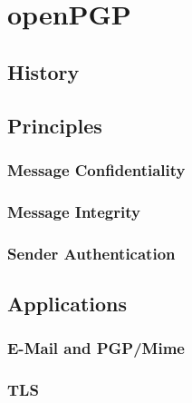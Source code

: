 \chapter{openPGP}


\section{History}

\section{Principles} \label{section:openpgp:principles}


\subsection{Message Confidentiality} \label{section:openpgp:confidentiality}


\subsection{Message Integrity} \label{section:openpgp:integrity}


\subsection{Sender Authentication} \label{section:openpgp:authentication}






\section{Applications}

\subsection{E-Mail and PGP/Mime}

\subsection{TLS}

